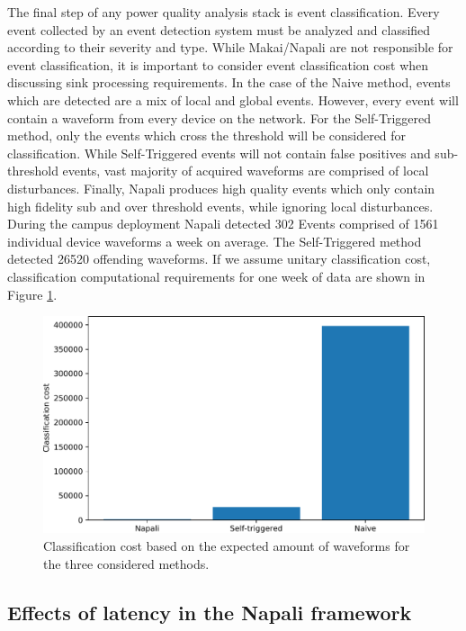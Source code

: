 The final step of any power quality analysis stack is event classification.
Every event collected by an event detection system must be analyzed and classified according to their severity and type.
While Makai/Napali are not responsible for event classification, it is important to consider event classification cost when discussing sink processing requirements.
In the case of the Naive method, events which are detected are a mix of local and global events.
However, every event will contain a waveform from every device on the network.
For the Self-Triggered method, only the events which cross the threshold will be considered for classification.
While Self-Triggered events will not contain false positives and sub-threshold events, vast majority of acquired waveforms are comprised of local disturbances.
Finally, Napali produces high quality events which only contain high fidelity sub and over threshold events, while ignoring local disturbances.
During the campus deployment Napali detected 302 Events comprised of 1561 individual device waveforms a week on average.
The Self-Triggered method detected 26520 offending waveforms.
If we assume unitary classification cost, classification computational requirements for one week of data are shown in Figure \ref{expdes:fig:classification}.
\begin{figure}[ht!]
    \centering
    \includegraphics[width=0.8\linewidth]{img/napali_eval/classification_cost.pdf}
    \caption{Classification cost based on the expected amount of waveforms for the three considered methods.}
    \label{expdes:fig:classification}
\end{figure}


\subsection{Effects of latency in the Napali framework}\label{subsec:effects-of-latency-in-the-napali-framework}


